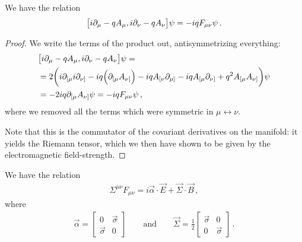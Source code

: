 \documentclass[main.tex]{subfiles}
\begin{document}
\begin{claim}
We have the relation 
%
\begin{align}
\qty[i \partial_{\mu } - q A_{\mu }, i \partial_{\nu } - q A_{\nu }] \psi 
= -iq F_{\mu \nu } \psi 
\,.
\end{align}
\end{claim}

\begin{proof}
We write the terms of the product out, antisymmetrizing everything: 
%
\begin{align}
&\qty[i \partial_{\mu } - q A_{\mu }, i \partial_{\nu } - q A_{\nu }] \psi = \\
&=2 \qty(i \partial_{[\mu }i \partial_{\nu ]}
- i q \qty(\partial_{[\mu } A_{\nu ]} ) 
-iq A_{[\nu } \partial_{\mu ]}
-iq A_{[\mu } \partial_{\nu ]}
+ q^2 A_{[\mu } A_{\nu ]}) \psi   \\
&= -2iq \partial_{[\mu } A_{\nu ]} \psi 
= -iq F_{\mu \nu } \psi 
\,,
\end{align}
%
where we removed all the terms which were symmetric in \(\mu \leftrightarrow \nu \). 

Note that this is the commutator of the covariant derivatives on the manifold: it yields the Riemann tensor, which we then have shown to be given by the electromagnetic field-strength.
\end{proof}

\begin{claim}
We have the relation 
%
\begin{align}
\Sigma^{\mu \nu }F_{\mu \nu }
=i \vec{\alpha} \cdot \vec{E} + \vec{\Sigma} \cdot \vec{B}
\,,
\end{align}
%
where 
%
\begin{align}
\vec{\alpha} = \left[\begin{array}{cc}
0 & \vec{\sigma} \\ 
\vec{\sigma} & 0
\end{array}\right] 
\qquad \text{and} \qquad
\vec{\Sigma} = \frac{1}{2} \left[\begin{array}{cc}
\vec{\sigma} & 0 \\ 
0 & \vec{\sigma}
\end{array}\right]
\,.
\end{align}
\end{claim}
\end{document}
